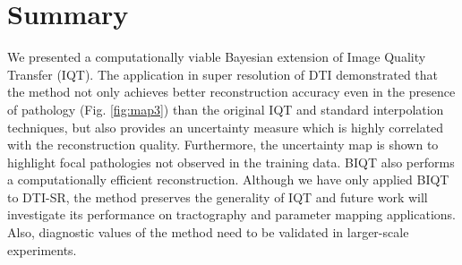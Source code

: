 	\section{Summary}
	We presented a computationally viable Bayesian extension of Image Quality Transfer (IQT). The application in super resolution of DTI demonstrated that the method not only achieves better reconstruction accuracy even in the presence of pathology (Fig. \ref{fig:map3}) than the original IQT and standard interpolation techniques, but also provides an uncertainty measure which is highly correlated with the reconstruction quality. Furthermore, the uncertainty map is shown to highlight focal pathologies not observed in the training data. BIQT also performs a computationally efficient reconstruction. Although we have only applied BIQT to DTI-SR, the method preserves the generality of IQT and future work will investigate its performance on tractography and parameter mapping applications. Also, diagnostic values of the method need to be validated in larger-scale experiments.
	
%
%
